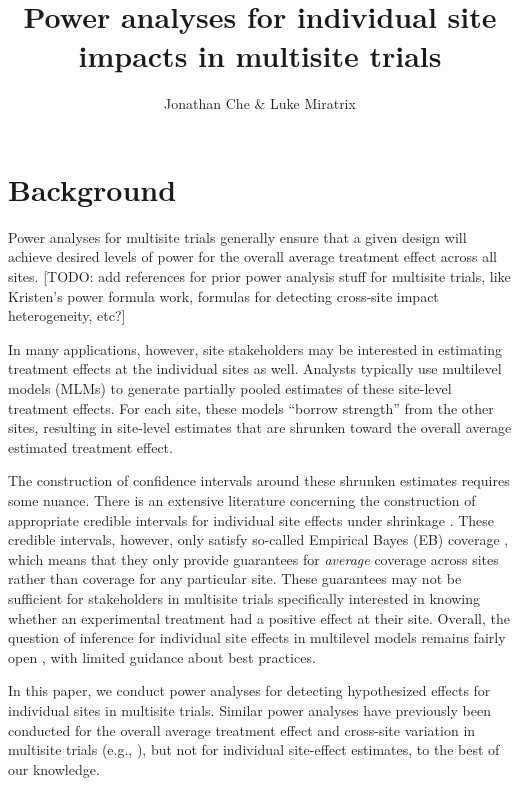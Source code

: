 \documentclass[]{article}
\title{Power analyses for individual site impacts in multisite trials}
\author{Jonathan Che \& Luke Miratrix}
\begin{document}
\maketitle


\section{Background}

Power analyses for multisite trials generally ensure that a given design will achieve desired levels of power for the overall average treatment effect across all sites. [TODO: add references for prior power analysis stuff for multisite trials, like Kristen’s power formula work, formulas for detecting cross-site impact heterogeneity, etc?] 

In many applications, however, site stakeholders may be interested in estimating treatment effects at the individual sites as well. 
Analysts typically use multilevel models (MLMs) to generate partially pooled estimates of these site-level treatment effects. 
For each site, these models ``borrow strength'' from the other sites, resulting in site-level estimates that are shrunken toward the overall average estimated treatment effect.

The construction of confidence intervals around these shrunken estimates requires some nuance. 
There is an extensive literature concerning the construction of appropriate credible intervals for individual site effects under shrinkage \citep{casella2012shrinkage}.
These credible intervals, however, only satisfy so-called Empirical Bayes (EB) coverage \citep{morris1983parametric}, which means that they only provide guarantees for \textit{average} coverage across sites rather than coverage for any particular site. 
These guarantees may not be sufficient for stakeholders in multisite trials specifically interested in knowing whether an experimental treatment had a positive effect at their site. 
Overall, the question of inference for individual site effects in multilevel models remains fairly open \citep{armstrong2020robust}, with limited guidance about best practices.

In this paper, we conduct power analyses for detecting hypothesized effects for individual sites in multisite trials. 
Similar power analyses have previously been conducted for the overall average treatment effect and cross-site variation in multisite trials (e.g., \citet{raudenbush2000statistical}), but not for individual site-effect estimates, to the best of our knowledge.
\end{document}
